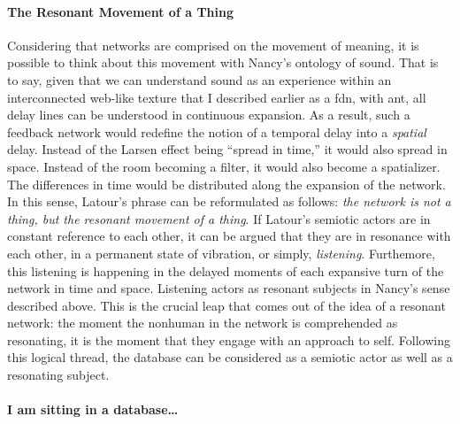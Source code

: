 \paragraph{The Resonant Movement of a Thing}
Considering that networks are comprised on the movement of meaning, it is possible to think about this movement with Nancy's ontology of sound. That is to say, given that we can understand sound as an experience within an interconnected web-like texture that I described earlier as a \gls{fdn}, with \gls{ant}, all delay lines can be understood in continuous expansion. As a result, such a feedback network would redefine the notion of a temporal delay into a \textit{spatial} delay. Instead of the Larsen effect being ``spread in time,'' it would also spread in space. Instead of the room becoming a filter, it would also become a spatializer. The differences in time would be distributed along the expansion of the network. In this sense, Latour's phrase can be reformulated as follows: \textit{the network is not a thing, but the resonant movement of a thing}. If Latour's semiotic actors are in constant reference to each other, it can be argued that they are in resonance with each other, in a permanent state of vibration, or simply, \textit{listening}. Furthemore, this listening is happening in the delayed moments of each expansive turn of the network in time and space. Listening actors as resonant subjects in Nancy's sense described above. This is the crucial leap that comes out of the idea of a resonant network: the moment the nonhuman in the network is comprehended as resonating, it is the moment that they engage with an approach to self. Following this logical thread, the database can be considered as a semiotic actor as well as a resonating subject. 

\paragraph{I am sitting in a database\dots}




